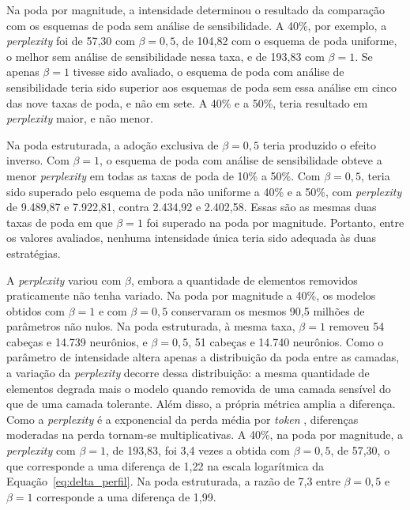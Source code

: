 Na poda por magnitude, a intensidade determinou o resultado da comparação com os esquemas de
poda sem análise de sensibilidade. A 40\%, por exemplo, a \textit{perplexity} foi de 57,30 com
$\beta = 0{,}5$, de 104,82 com o esquema de poda uniforme, o melhor sem análise de
sensibilidade nessa taxa, e de 193,83 com $\beta = 1$. Se apenas $\beta = 1$ tivesse sido
avaliado, o esquema de poda com análise de sensibilidade teria sido superior aos esquemas de
poda sem essa análise em cinco das nove taxas de poda, e não em sete.
A 40\% e a 50\%, teria resultado em \textit{perplexity}
maior, e não menor.

Na poda estruturada, a adoção exclusiva de $\beta = 0{,}5$ teria produzido o efeito inverso.
Com $\beta = 1$, o esquema de poda com análise de sensibilidade obteve a menor
\textit{perplexity} em todas as taxas de poda de 10\% a 50\%.
Com $\beta = 0{,}5$, teria sido superado pelo esquema de
poda não uniforme a 40\% e a 50\%, com \textit{perplexity} de 9.489,87 e 7.922,81, contra
2.434,92 e 2.402,58. Essas são as mesmas duas taxas de poda em que $\beta = 1$ foi superado na
poda por magnitude. Portanto, entre os valores avaliados, nenhuma intensidade única teria sido
adequada às duas estratégias.

A \textit{perplexity} variou com $\beta$, embora a quantidade de elementos removidos
praticamente não tenha variado. Na poda por magnitude a 40\%, os modelos obtidos com $\beta =
1$ e com $\beta = 0{,}5$ conservaram os mesmos 90,5 milhões de parâmetros não nulos. Na poda
estruturada, à mesma taxa, $\beta = 1$ removeu 54 cabeças e 14.739 neurônios, e $\beta =
0{,}5$, 51 cabeças e 14.740 neurônios. Como o parâmetro de intensidade altera apenas a
distribuição da poda entre as camadas, a variação da
\textit{perplexity} decorre dessa distribuição: a mesma quantidade de elementos degrada mais o
modelo quando removida de uma camada sensível do que de uma camada tolerante. Além disso, a
própria métrica amplia a diferença. Como a \textit{perplexity} é a exponencial da perda média
por \textit{token} \cite{HuggingFacePerplexity}, diferenças moderadas na perda tornam-se
multiplicativas. A 40\%, na poda por magnitude, a \textit{perplexity} com $\beta = 1$, de
193,83, foi 3,4 vezes a obtida com $\beta = 0{,}5$, de 57,30, o que corresponde a uma diferença
de 1,22 na escala logarítmica da Equação~\ref{eq:delta_perfil}. Na poda estruturada, a razão de
7,3 entre $\beta = 0{,}5$ e $\beta = 1$ corresponde a uma diferença de 1,99.

